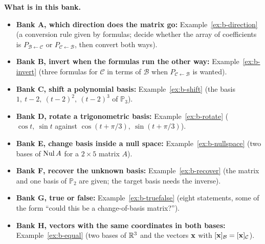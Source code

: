 \documentclass[11pt]{article}
\begin{document}
\textbf{What is in this bank.}
\begin{itemize}
  \item \textbf{Bank A, which direction does the matrix go:} Example~\ref{ex:b-direction} (a conversion rule given by formulas; decide whether the array of coefficients is $P_{\mathcal{B}\leftarrow\mathcal{C}}$ or $P_{\mathcal{C}\leftarrow\mathcal{B}}$, then convert both ways).
  \item \textbf{Bank B, invert when the formulas run the other way:} Example~\ref{ex:b-invert} (three formulas for $\mathcal{C}$ in terms of $\mathcal{B}$ when $P_{\mathcal{C}\leftarrow\mathcal{B}}$ is wanted).
  \item \textbf{Bank C, shift a polynomial basis:} Example~\ref{ex:b-shift} (the basis $1,\ t-2,\ (t-2)^2,\ (t-2)^3$ of $\mathbb{P}_3$).
  \item \textbf{Bank D, rotate a trigonometric basis:} Example~\ref{ex:b-rotate} ($\cos t,\ \sin t$ against $\cos(t+\pi/3),\ \sin(t+\pi/3)$).
  \item \textbf{Bank E, change basis inside a null space:} Example~\ref{ex:b-nullspace} (two bases of $\operatorname{Nul} A$ for a $2\times5$ matrix $A$).
  \item \textbf{Bank F, recover the unknown basis:} Example~\ref{ex:b-recover} (the matrix and one basis of $\mathbb{P}_2$ are given; the target basis needs the inverse).
  \item \textbf{Bank G, true or false:} Example~\ref{ex:b-truefalse} (eight statements, some of the form ``could this be a change-of-basis matrix?'').
  \item \textbf{Bank H, vectors with the same coordinates in both bases:} Example~\ref{ex:b-equal} (two bases of $\mathbb{R}^3$ and the vectors $\mathbf{x}$ with $[\mathbf{x}]_{\mathcal{B}}=[\mathbf{x}]_{\mathcal{C}}$).
\end{itemize}
\end{document}
